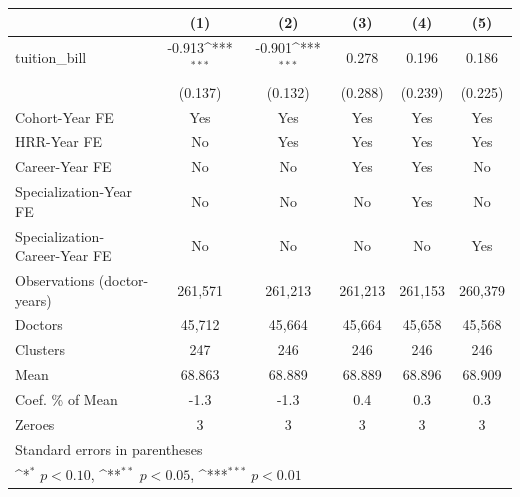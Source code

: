 {
\def\sym#1{\ifmmode^{#1}\else\(^{#1}\)\fi}
\begin{tabular}{l*{5}{c}}
\hline\hline
                    &\multicolumn{1}{c}{(1)}         &\multicolumn{1}{c}{(2)}         &\multicolumn{1}{c}{(3)}         &\multicolumn{1}{c}{(4)}         &\multicolumn{1}{c}{(5)}         \\
\hline
tuition\_bill        &      -0.913\sym{***}&      -0.901\sym{***}&       0.278         &       0.196         &       0.186         \\
                    &     (0.137)         &     (0.132)         &     (0.288)         &     (0.239)         &     (0.225)         \\
[1em]
Cohort-Year FE      &         Yes         &         Yes         &         Yes         &         Yes         &         Yes         \\
[1em]
HRR-Year FE         &          No         &         Yes         &         Yes         &         Yes         &         Yes         \\
[1em]
Career-Year FE      &          No         &          No         &         Yes         &         Yes         &          No         \\
[1em]
Specialization-Year FE&          No         &          No         &          No         &         Yes         &          No         \\
[1em]
Specialization-Career-Year FE&          No         &          No         &          No         &          No         &         Yes         \\
\hline
Observations (doctor-years)&     261,571         &     261,213         &     261,213         &     261,153         &     260,379         \\
Doctors             &      45,712         &      45,664         &      45,664         &      45,658         &      45,568         \\
Clusters            &         247         &         246         &         246         &         246         &         246         \\
Mean                &      68.863         &      68.889         &      68.889         &      68.896         &      68.909         \\
Coef. \% of Mean    &        -1.3         &        -1.3         &         0.4         &         0.3         &         0.3         \\
Zeroes              &           3         &           3         &           3         &           3         &           3         \\
\hline\hline
\multicolumn{6}{l}{\footnotesize Standard errors in parentheses}\\
\multicolumn{6}{l}{\footnotesize \sym{*} \(p<0.10\), \sym{**} \(p<0.05\), \sym{***} \(p<0.01\)}\\
\end{tabular}
}
